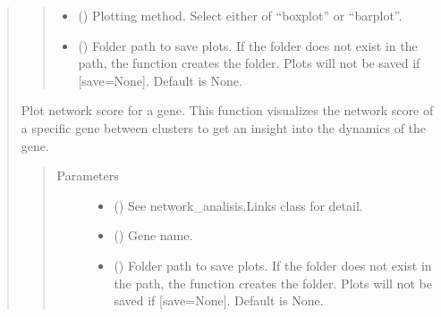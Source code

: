 \documentclass[letterpaper,10pt,english]{sphinxmanual}
\begin{document}
\begin{quote}
\begin{fulllineitems}
\begin{fulllineitems}
\begin{quote}
\begin{description}
\begin{itemize}
\item {} 
 () \textendash{} Plotting method. Select either of “boxplot” or “barplot”.

\item {} 
 () \textendash{} Folder path to save plots. If the folder does not exist in the path, the function creates the folder.
Plots will not be saved if {[}save=None{]}. Default is None.

\end{itemize}

\end{description}\end{quote}

\end{fulllineitems}


\begin{fulllineitems}
\label{\detokenize{modules/celloracle.network_analysis:celloracle.network_analysis.Links.plot_score_per_cluster}}
Plot network score for a gene.
This function visualizes the network score of a specific gene between clusters to get an insight into the dynamics of the gene.
\begin{quote}\begin{description}
\item[{Parameters}] \leavevmode\begin{itemize}
\item {} 
 ({\hyperref[\detokenize{modules/celloracle:celloracle.Links}]{}}) \textendash{} See network\_analisis.Links class for detail.

\item {} 
 () \textendash{} Gene name.

\item {} 
 () \textendash{} Folder path to save plots. If the folder does not exist in the path, the function creates the folder.
Plots will not be saved if {[}save=None{]}. Default is None.


\end{itemize}
\end{description}
\end{quote}
\end{fulllineitems}
\end{fulllineitems}
\end{quote}
\end{document}
